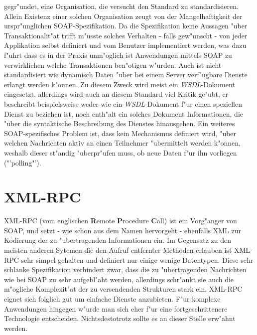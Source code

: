 gegr"undet, eine Organisation, die versucht den Standard zu standardisieren. Allein Existenz einer solchen Organisation zeugt von der
Mangelhaftigkeit der urspr"unglichen SOAP-Spezifikation.
Da die Spezifikation keine Aussagen "uber Transaktionalit"at trifft m"usste solches Verhalten - falls gew"unscht - von jeder Applikation selbst
definiert und vom Benutzer implementiert werden, was dazu f"uhrt dass es in der Praxis unm"oglich ist Anwendungen mittels SOAP zu
verwirklichen welche Transaktionen ben"otigen w"urden. Auch ist nicht standardisiert wie dynamisch Daten "uber bei einem Server verf"ugbare
Dienste erlangt werden k"onnen. Zu diesem Zweck wird meist ein \emph{WSDL}-Dokument \cite{WSDLSPEC} eingesetzt, allerdings wird auch an diesem
Standard viel Kritik ge"ubt, er beschreibt beispielsweise weder wie ein \emph{WSDL}-Dokument f"ur einen speziellen Dienst zu beziehen ist,
noch enth"alt ein solches Dokument Informationen, die "uber die syntaktische Beschreibung des Dienstes hinausgehen.
Ein weiteres SOAP-spezifisches Problem ist,
dass kein Mechanismus definiert wird, "uber welchen Nachrichten aktiv an einen Teilnehmer "ubermittelt werden k"onnen, weshalb dieser
st"andig "uberpr"ufen muss, ob neue Daten f"ur ihn vorliegen ("'polling"').

\section{XML-RPC}
\label{sec:background:xmlrpc}
XML-RPC (vom englischen \textbf{R}emote \textbf{P}rocedure \textbf{C}all) ist ein Vorg"anger von SOAP, und setzt - wie schon
aus dem Namen hervorgeht - ebenfalls XML zur Kodierung der zu "ubertragenden Informationen ein. Im Gegensatz zu den meisten anderen
Sytemen die den Aufruf entfernter Methoden erlauben ist XML-RPC sehr simpel gehalten und definiert nur einige wenige
Datentypen. Diese sehr schlanke Spezifikation verhindert zwar, dass die zu "ubertragenden Nachrichten wie bei SOAP zu sehr 
aufgebl"aht werden, allerdings schr"ankt sie auch die m"ogliche Komplexit"at der zu versendenden Strukturen stark ein.
XML-RPC eignet sich folglich gut um einfache Dienste anzubieten. F"ur komplexe Anwendungen hingegen w"urde man sich eher 
f"ur eine fortgeschrittenere Technologie entscheiden. Nichtsdestotrotz sollte es an dieser Stelle erw"ahnt werden.

